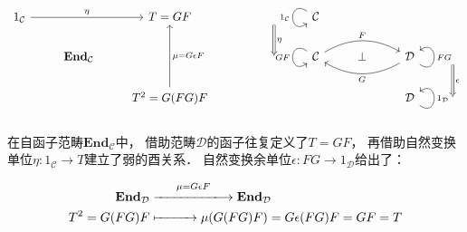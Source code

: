 \documentclass[10pt, openany]{book}
\begin{document}
$$
\begin{tikzcd}
1_\mathcal C \arrow[rr, "\eta"] &                         & T=GF                                           &  & {} \arrow[d, "\eta", Rightarrow] & \mathcal C \arrow["1_\mathcal C"', loop, distance=2em, in=215, out=145]                  &      &                                                                                         &                                      \\
                                & \textbf{End}_\mathcal C &                                                &  & {}                               & \mathcal C \arrow[rr, "F", bend left] \arrow["GF"', loop, distance=2em, in=215, out=145] & \bot & \mathcal D \arrow[ll, "G", bend left] \arrow["FG"', loop, distance=2em, in=35, out=325] & {} \arrow[d, "\epsilon", Rightarrow] \\
                                &                         & T^2 = G(FG)F \arrow[uu, "\mu = G \epsilon F"'] &  &                                  &                                                                                          &      & \mathcal D \arrow["1_\mathcal D"', loop, distance=2em, in=35, out=325]                  & {}                                  
\end{tikzcd}
$$

在自函子范畴$\textbf{End}_\mathcal C$中，
借助范畴$\mathcal D$的函子往复定义了$T = GF$，
再借助自然变换单位$\eta: 1_\mathcal C \to T$建立了弱的酉关系．
自然变换余单位$\epsilon: FG \to 1_\mathcal D$给出了：

$$
\begin{aligned}
\textbf{End}_\mathcal D &\stackrel{\mu = G \epsilon F}{\xlongrightarrow{\hspace{2cm}}} \textbf{End}_\mathcal D \\
T^2 = G(FG)F &\xmapsto{\hspace{1cm}} \mu(G(FG)F) = G \epsilon(FG) F = GF = T
\end{aligned}
$$
\end{document}
